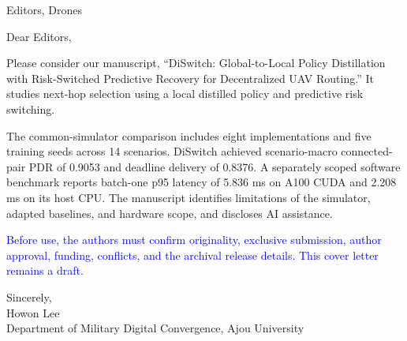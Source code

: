 \documentclass{article}
\begin{document}
Editors, Drones

Dear Editors,

Please consider our manuscript, ``DiSwitch: Global-to-Local Policy Distillation with Risk-Switched Predictive Recovery for Decentralized UAV Routing.'' It studies next-hop selection using a local distilled policy and predictive risk switching.

The common-simulator comparison includes eight implementations and five training seeds across 14 scenarios. DiSwitch achieved scenario-macro connected-pair PDR of 0.9053 and deadline delivery of 0.8376. A separately scoped software benchmark reports batch-one p95 latency of 5.836 ms on A100 CUDA and 2.208 ms on its host CPU. The manuscript identifies limitations of the simulator, adapted baselines, and hardware scope, and discloses AI assistance.

\textcolor{blue}{Before use, the authors must confirm originality, exclusive submission, author approval, funding, conflicts, and the archival release details. This cover letter remains a draft.}

Sincerely,\\Howon Lee\\Department of Military Digital Convergence, Ajou University
\end{document}

